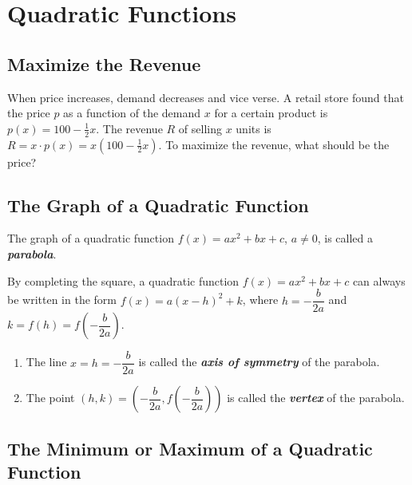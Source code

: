 \documentclass[en,11pt]{elegantbook}
\newcommand{\size}[2]{{\fontsize{#1}{0}\selectfont#2}}
\newenvironment{rmdthink}{
	\vspace*{0.5\baselineskip}
	\par\noindent
	\makebox[-4pt][r]{\color{green!90}\size{12}{\faLightbulbO}\,\,}
    \begin{tcolorbox}[
    enhanced,
    title={\textbf{\color{second}Think}},
    title style={left color=blue!10!green!20!white,right color=yellow!20!blue!20!white},
    colback=green!20!white,
    ]
    \sffamily
}{
    \end{tcolorbox}
	\par\ignorespacesafterend
}
\begin{document}
\hypertarget{quadratic-functions}{%
\chapter{Quadratic Functions}\label{quadratic-functions}}

\hypertarget{maximize-the-revenue}{%
\section{Maximize the Revenue}\label{maximize-the-revenue}}

\begin{rmdthink}

When price increases, demand decreases and vice verse. A retail store found that the price \(p\) as a function of the demand \(x\) for a certain product is \(p(x)=100-\frac12 x\). The revenue \(R\) of selling \(x\) units is \(R=x\cdot p(x)=x(100-\frac12x)\). To maximize the revenue, what should be the price?

\end{rmdthink}

\hypertarget{the-graph-of-a-quadratic-function}{%
\section{The Graph of a Quadratic Function}\label{the-graph-of-a-quadratic-function}}

The graph of a quadratic function \(f(x)=ax^2+bx+c\), \(a\neq 0\), is called a \textbf{\emph{parabola}}.

By completing the square, a quadratic function \(f(x)=ax^2+bx+c\) can always be written in the form \(f(x)=a(x-h)^2+k\), where \(h=-\dfrac{b}{2a}\) and \(k=f(h)=f\left(-\dfrac{b}{2a}\right)\).

\begin{enumerate}
\def\labelenumi{\arabic{enumi}.}

\item
  The line \(x=h=-\dfrac{b}{2a}\) is called the \textbf{\emph{axis of symmetry}} of the parabola.
\item
  The point \((h, k)=\left(-\dfrac{b}{2a}, f\left(-\dfrac{b}{2a}\right)\right)\) is called the \textbf{\emph{vertex}} of the parabola.
\end{enumerate}

\hypertarget{the-minimum-or-maximum-of-a-quadratic-function}{%
\section{The Minimum or Maximum of a Quadratic Function}\label{the-minimum-or-maximum-of-a-quadratic-function}}
\end{document}
